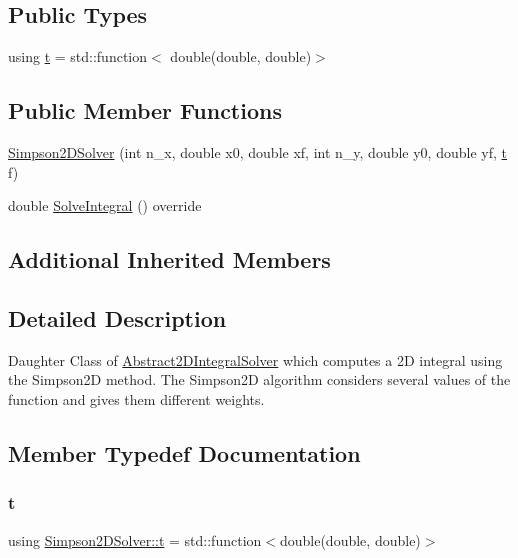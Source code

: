 \subsection*{Public Types}
\begin{DoxyCompactItemize}
\item 
using \hyperlink{class_simpson2_d_solver_a0267d4b1dec3215e954667b1699e687f}{t} = std\+::function$<$ double(double, double)$>$
\end{DoxyCompactItemize}
\subsection*{Public Member Functions}
\begin{DoxyCompactItemize}
\item 
\hyperlink{class_simpson2_d_solver_a16ade6b2b5e89031c452f11e70c2f8fb}{Simpson2\+D\+Solver} (int n\+\_\+x, double x0, double xf, int n\+\_\+y, double y0, double yf, \hyperlink{class_simpson2_d_solver_a0267d4b1dec3215e954667b1699e687f}{t} f)
\item 
double \hyperlink{class_simpson2_d_solver_a3fc19037fef83ad05381138d9f7da939}{Solve\+Integral} () override
\end{DoxyCompactItemize}
\subsection*{Additional Inherited Members}


\subsection{Detailed Description}
Daughter Class of \hyperlink{class_abstract2_d_integral_solver}{Abstract2\+D\+Integral\+Solver} which computes a 2D integral using the Simpson2D method. The Simpson2D algorithm considers several values of the function and gives them different weights. 

\subsection{Member Typedef Documentation}
\mbox{\label{class_simpson2_d_solver_a0267d4b1dec3215e954667b1699e687f}} 
\subsubsection{\texorpdfstring{t}{t}}
{\footnotesize\ttfamily using \hyperlink{class_simpson2_d_solver_a0267d4b1dec3215e954667b1699e687f}{Simpson2\+D\+Solver\+::t} =  std\+::function$<$double(double, double)$>$}

